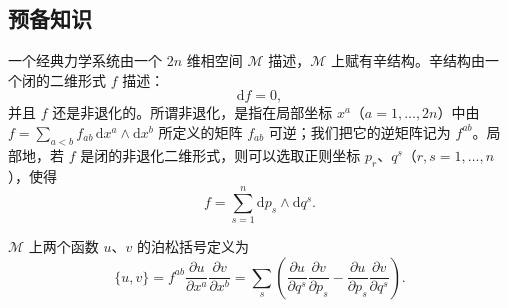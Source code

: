 \documentclass[11pt,a4paper,UTF8]{ctexart}
\theoremstyle{plain}
\theoremstyle{definition}
\begin{document}
\subsection{预备知识}

一个经典力学系统由一个 $2n$ 维相空间 $\mathcal{M}$ 描述，$\mathcal{M}$ 上赋有辛结构。辛结构由一个闭的二维形式 $f$ 描述：
\begin{equation}
    \mathrm{d}f = 0,
    \tag{2.1}
\end{equation}
并且 $f$ 还是非退化的。所谓非退化，是指在局部坐标 $x^a$（$a=1,\dots,2n$）中由
$f=\sum_{a<b}f_{ab}\,\mathrm{d}x^a\wedge\mathrm{d}x^b$ 所定义的矩阵 $f_{ab}$ 可逆；我们把它的逆矩阵记为 $f^{ab}$。局部地，若 $f$ 是闭的非退化二维形式，则可以选取正则坐标 $p_r$、$q^s$（$r,s=1,\dots,n$），使得
\begin{equation}
    f = \sum_{s=1}^{n}\mathrm{d}p_s\wedge\mathrm{d}q^s .
    \tag{2.2}
\end{equation}


$\mathcal{M}$ 上两个函数 $u$、$v$ 的泊松括号定义为
\begin{equation}
    \{u,v\}
    = f^{ab}\frac{\partial u}{\partial x^a}\frac{\partial v}{\partial x^b}
    = \sum_{s}\left(\frac{\partial u}{\partial q^s}\frac{\partial v}{\partial p_s}
    -\frac{\partial u}{\partial p_s}\frac{\partial v}{\partial q^s}\right).
    \tag{2.3}
\end{equation}

\end{document}
